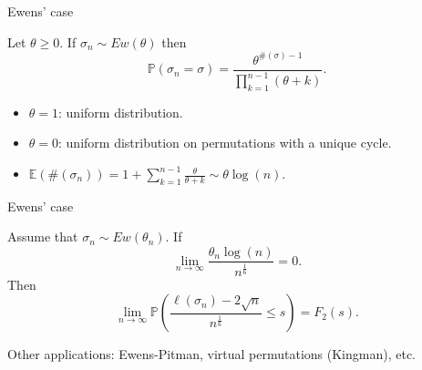 \documentclass[english,xcolor=table]{beamer}
\begin{document}
\begin{frame}{Ewens' case}
\begin{definition}
Let $\theta\geq 0$. If $\sigma_n\sim Ew(\theta)$ then
\begin{equation*}
\mathbb{P}(\sigma_n=\sigma)=\frac{\theta^{\#(\sigma)-1}}{\prod_{k=1}^{n-1}(\theta+k)}.\end{equation*}
\end{definition}
\vspace{5 mm}

\begin{itemize}
\item $\theta=1$:  uniform distribution.
\item $\theta=0$: uniform distribution on permutations with a unique cycle. 
\item $\mathbb{E}(\#(\sigma_n))= 1+\sum_{k=1}^{n-1} \frac{\theta}{\theta+k}\sim \theta \log(n).$
\end{itemize}
\end{frame}
\begin{frame}{Ewens' case}
\begin{corollary} \label{2.1}
Assume that $\sigma_n\sim Ew(\theta_n)$. If
\begin{equation}\tag{H'2}\label{ewcond}
\lim_{n\to \infty} \frac{\theta_n \log(n)  }{n^\frac 1 6}=0.
\end{equation}
Then 
\begin{equation}  \tag{TW}
\lim_{n\to \infty} \mathbb{P}\left(\frac{\ell(\sigma_n)-2\sqrt{n}}{n^\frac 16}\leq s\right)=F_2(s).
\end{equation}
\end{corollary}
\vspace{10 mm }
Other applications: Ewens-Pitman, virtual permutations (Kingman), etc.
\end{frame}
\end{document}
